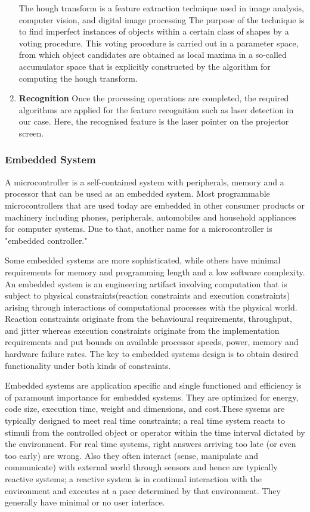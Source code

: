 \documentclass[12pt, a4paper]{article}
\begin{document}
\begin{enumerate}
The hough transform is a feature extraction technique
used in image analysis, computer vision, and digital image processing The purpose
of the technique is to find imperfect instances of objects within a certain class of
shapes by a voting procedure. This voting procedure is carried out in a parameter
space, from which object candidates are obtained as local maxima in a so-called
accumulator space that is explicitly constructed by the algorithm for computing the
hough transform.

\item \textbf{Recognition}
Once the  processing operations are completed, the required algorithms are applied for the feature recognition such as laser detection in our case. Here, the recognised feature is the laser pointer on the projector screen.
\end{enumerate}

\subsubsection{Embedded System}
A microcontroller is a self-contained system with peripherals, memory and a processor that can be used as an embedded system. Most programmable microcontrollers that are used today are embedded in other consumer products or machinery including phones, peripherals, automobiles and household appliances for computer systems. Due to that, another name for a microcontroller is "embedded controller." 

Some embedded systems are more sophisticated, while others have minimal requirements for memory and programming length and a low software complexity. An embedded system is an engineering artifact involving computation that is subject to physical constraints(reaction constraints and execution constraints) arising through interactions of computational processes with the physical world. Reaction constraints originate from the behavioural requirements, throughput, and jitter whereas execution constraints originate from the implementation requirements and put bounds on available processor speeds, power, memory and hardware failure rates. The key to embedded systems design is to obtain desired functionality under both kinds of constraints. 

Embedded systems are application specific and single functioned and efficiency is of paramount importance for embedded systems. They are optimized for energy, code size, execution time, weight and dimensions, and cost.These sysems are typically designed to meet real time constraints; a real time system reacts to stimuli from the controlled object or operator within the time interval dictated by the environment. For real time systems, right answers arriving too late (or even too early) are wrong. Also they often interact (sense, manipulate and communicate) with external world through sensors and hence are typically reactive systems; a reactive system is in continual interaction with the environment and executes at a pace determined by that environment.
They generally have minimal or no user interface. 
\end{document}
